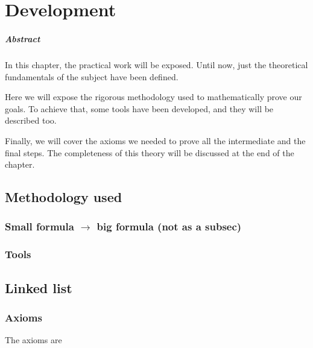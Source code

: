 \chapter{Development\label{sec:develpment}}

\paragraph{Abstract} In this chapter, the practical work will be exposed. Until now, just the theoretical fundamentals of the subject have been defined.

Here we will expose the rigorous methodology used to mathematically prove our goals. To achieve that, some tools have been developed, and they will be described too.

Finally, we will cover the axioms we needed to prove all the intermediate and the final steps. The completeness of this theory will be discussed at the end of the chapter. 

\section{Methodology used}

\subsection{Small formula $\rightarrow$ big formula (not as a subsec)}

\subsection{Tools}

\section{Linked list}

\subsection{Axioms}


The axioms are

\begin{description}

\end{description}

